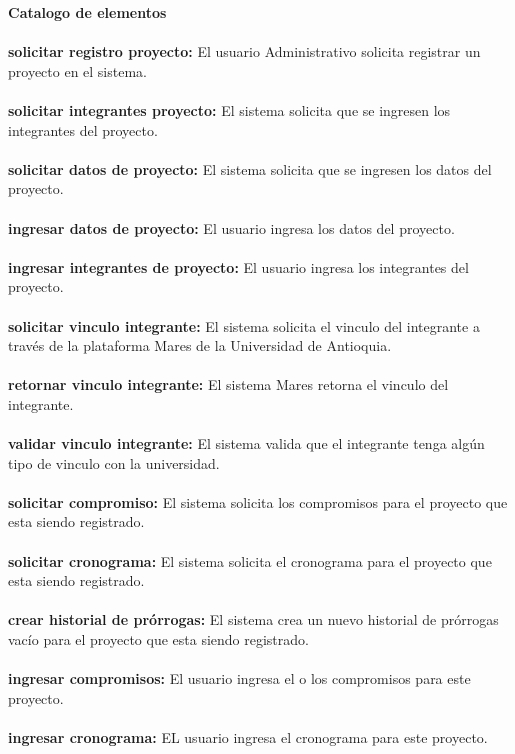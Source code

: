 \documentclass[12pt,oneside,letterpaper]{report}
\begin{document}

\textbf{Catalogo de elementos}\\
\\
\textbf{solicitar registro proyecto:} El usuario Administrativo solicita registrar un proyecto en el sistema.\\
\\
\textbf{solicitar integrantes proyecto:} El sistema solicita que se ingresen los integrantes del proyecto.\\
\\
\textbf{solicitar datos de proyecto:} El sistema solicita que se ingresen los datos del proyecto.\\
\\
\textbf{ingresar datos de proyecto:} El usuario ingresa los datos del proyecto.\\
\\
\textbf{ingresar integrantes de proyecto:} El usuario ingresa los integrantes del proyecto.\\
\\
\textbf{solicitar vinculo integrante:} El sistema solicita el vinculo del integrante a través de la plataforma Mares de la Universidad de Antioquia.\\
\\
\textbf{retornar vinculo integrante:} El sistema Mares retorna el vinculo del integrante.\\
\\
\textbf{validar vinculo integrante:} El sistema valida que el integrante tenga algún tipo de vinculo con la universidad.\\
\\
\textbf{solicitar compromiso:} El sistema solicita los compromisos para el proyecto que esta siendo registrado.\\
\\
\textbf{solicitar cronograma:} El sistema solicita el cronograma para el proyecto que esta siendo registrado.\\
\\
\textbf{crear historial de prórrogas:} El sistema crea un nuevo historial de prórrogas vacío para el proyecto que esta siendo registrado.\\
\\
\textbf{ingresar compromisos:} El usuario ingresa el o los compromisos para este proyecto.\\
\\
\textbf{ingresar cronograma:} EL usuario ingresa el cronograma para este proyecto.\\
\end{document}
